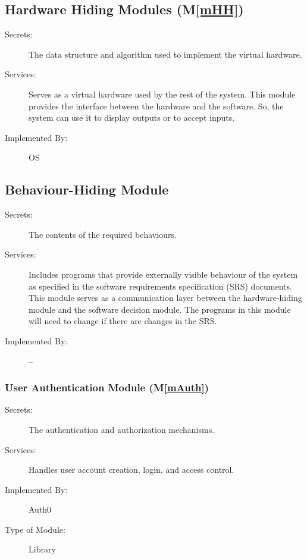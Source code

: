 \documentclass[12pt, titlepage]{article}
\newcommand{\mref}[1]{M\ref{#1}}
\begin{document}
\subsection{Hardware Hiding Modules (\mref{mHH})}

\begin{description}
\item[Secrets:] The data structure and algorithm used to implement the virtual
  hardware.
\item[Services:] Serves as a virtual hardware used by the rest of the
  system. This module provides the interface between the hardware and the
  software. So, the system can use it to display outputs or to accept inputs.
\item[Implemented By:] OS  
\end{description}

\subsection{Behaviour-Hiding Module}

\begin{description}
\item[Secrets:] The contents of the required behaviours.
\item[Services:] Includes programs that provide externally visible behaviour of
  the system as specified in the software requirements specification (SRS)
  documents. This module serves as a communication layer between the
  hardware-hiding module and the software decision module. The programs in this
  module will need to change if there are changes in the SRS.
\item[Implemented By:] --
\end{description}

\subsubsection{User Authentication Module (\mref{mAuth})}

\begin{description}
\item[Secrets:] The authentication and authorization mechanisms.
\item[Services:] Handles user account creation, login, and access control.
\item[Implemented By:] Auth0
\item[Type of Module:] Library
\end{description}
\end{document}
